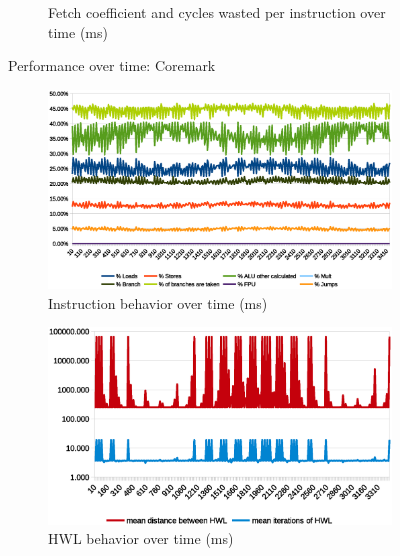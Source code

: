 \documentclass[../bachelor_paper.tex]{subfiles}
\begin{document}
\begin{figure}
\begin{subfigure}{\textwidth}
        \caption{Fetch coefficient and cycles wasted per instruction over time (ms)}
        \label{fig:res/coremark/fetch_waste}
    \end{subfigure}
    \caption{Performance over time: Coremark}
    \label{fig:res/coremark}
\end{figure}

\begin{figure}
    \begin{subfigure}{\textwidth}
        \centering
        \includegraphics[height=0.26\textheight]{img/graph/embench/sglib-combined_inst.eps}
        \caption{Instruction behavior over time (ms)}
        \label{fig:res/sglib/inst}
    \end{subfigure}
    \begin{subfigure}{\textwidth}
        \centering
        \includegraphics[height=0.26\textheight]{img/graph/embench/sglib-combined_hwl.eps}
        \caption{\ac{HWL} behavior over time (ms)}
        \label{fig:res/sglib/hwl}
    \end{subfigure}
    \begin{subfigure}{\textwidth}

\end{subfigure}
\end{figure}
\end{document}

